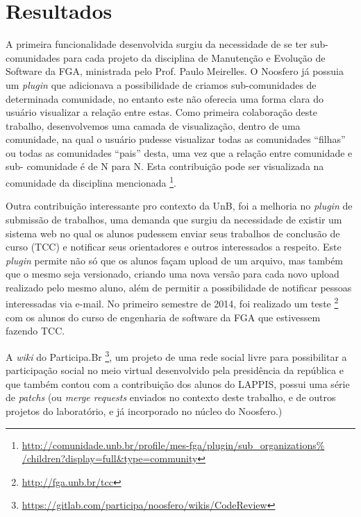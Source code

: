 \section{Resultados}
\label{sec:resultados}

A primeira funcionalidade desenvolvida surgiu da necessidade de se ter sub-%
comunidades para cada projeto da disciplina de Manutenção e Evolução de
Software da FGA, ministrada pelo Prof. Paulo Meirelles. O Noosfero já possuia
um \textit{plugin} que adicionava a possibilidade de criamos sub-comunidades
de determinada comunidade, no entanto este não oferecia uma forma clara do
usuário visualizar a relação entre estas. Como primeira colaboração deste
trabalho, desenvolvemos uma camada de visualização, dentro de uma comunidade,
na qual o usuário pudesse visualizar todas as comunidades ``filhas'' ou todas
as comunidades ``pais'' desta, uma vez que a relação entre comunidade e sub-%
comunidade é de N para N. Esta contribuição pode ser visualizada na comunidade
da disciplina mencionada%
\footnote{\url{http://comunidade.unb.br/profile/mes-fga/plugin/sub_organizations%
/children?display=full&type=community}}.

Outra contribuição interessante pro contexto da UnB, foi a melhoria no
\textit{plugin} de submissão de trabalhos, uma demanda que surgiu da
necessidade de existir um sistema web no qual os alunos pudessem enviar
seus trabalhos de conclusão de curso (TCC) e notificar seus orientadores e outros
interessados a respeito. Este \textit{plugin} permite não só que os alunos
façam upload de um arquivo, mas também que o mesmo seja versionado, criando
uma nova versão para cada novo upload realizado pelo mesmo aluno, além de
permitir a possibilidade de notificar pessoas interessadas via e-mail.
No primeiro semestre de 2014, foi realizado um teste%
\footnote{\url{http://fga.unb.br/tcc}} com os alunos do curso de engenharia de
software da FGA que estivessem fazendo TCC.

A \textit{wiki} do Participa.Br%
\footnote{\url{https://gitlab.com/participa/noosfero/wikis/CodeReview}},
um projeto de uma rede social livre para
possibilitar a participação social no meio virtual desenvolvido pela
presidência da república e que também contou com a contribuição dos alunos
do LAPPIS, possui uma série de \textit{patchs} (ou \textit{merge requests}
enviados no contexto deste trabalho, e de outros projetos do laboratório, e
já incorporado no núcleo do Noosfero.)
